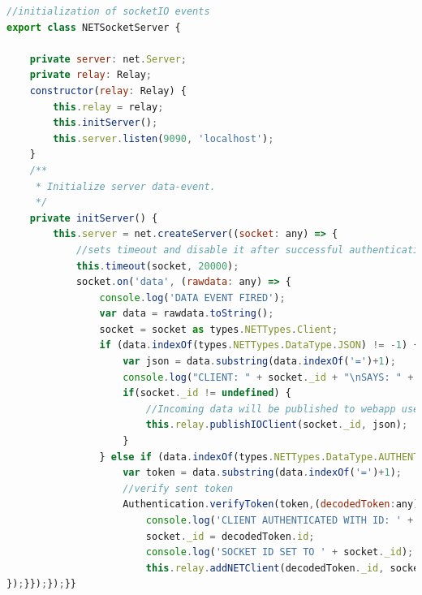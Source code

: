 \lstset{escapechar=?,style=customjava}
\begin{lstlisting}[language=javascript, caption=Erstellen des Socket-Servers]
//initialization of socketIO events
export class NETSocketServer {

    private server: net.Server;
    private relay: Relay;
    constructor(relay: Relay) {
        this.relay = relay;
        this.initServer();
        this.server.listen(9090, 'localhost');
    }
    /**
     * Initialize server data-event.
     */
    private initServer() {
        this.server = net.createServer((socket: any) => {
            //sets timeout and disable it after successful authentication
            this.timeout(socket, 20000);
            socket.on('data', (rawdata: any) => {
                console.log('DATA EVENT FIRED');
                var data = rawdata.toString();
                socket = socket as types.NETTypes.Client;
                if (data.indexOf(types.NETTypes.DataType.JSON) != -1) {
                    var json = data.substring(data.indexOf('=')+1);
                    console.log("CLIENT: " + socket._id + "\nSAYS: " + json);
                    if(socket._id != undefined) {
                        //Incoming data will be published to webapp users
                        this.relay.publishIOClient(socket._id, json);
                    }
                } else if (data.indexOf(types.NETTypes.DataType.AUTHENTICATION) != -1) {
                    var token = data.substring(data.indexOf('=')+1);
                    //verify sent token
                    Authentication.verifyToken(token,(decodedToken:any) => {
                        console.log('CLIENT AUTHENTICATED WITH ID: ' + decodedToken._id);
                        socket._id = decodedToken.id;
                        console.log('SOCKET ID SET TO ' + socket._id);
                        this.relay.addNETClient(decodedToken._id, socket);
});}});});}}
\end{lstlisting}
\lstset{escapechar=@,style=customjava}

\clearpage
